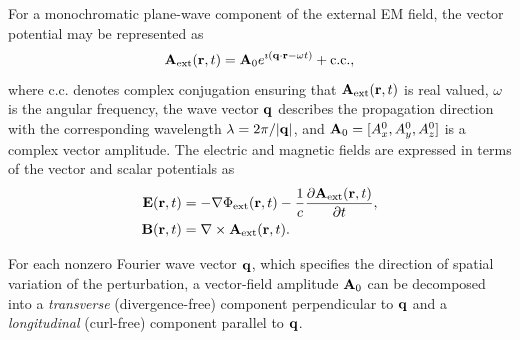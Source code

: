 For a monochromatic plane-wave component of the external EM field,
the vector potential may be represented as
\begin{equation}
 \vb A_{\mathrm{ext}}(\vb r,t)
 =\vb A_0 e^{\imath(\vb q\cdot\vb r-\omega t)}+\mathrm{c.c.},
 \label{eq:plane_wave_vector_potential}
\end{equation}
where c.c. denotes complex conjugation ensuring that $\vb A_{\mathrm{ext}}(\vb r,t)$ is real valued,
$\omega$ is the angular frequency, the wave vector $\vb q$
describes the propagation direction with the corresponding  wavelength
$\lambda=2\pi/|\vb q|$, and $\vb A_0=[A_x^0,A_y^0,A_z^0]$
is a complex vector  amplitude.
The electric and magnetic fields are
expressed in terms of the vector and scalar potentials as
\begin{align}
 \vb E(\vb r,t)
 &=-\nabla\Phi_{\mathrm{ext}}(\vb r,t)
   -\frac{1}{c}\frac{\partial\vb A_{\mathrm{ext}}(\vb r,t)}{\partial t},
 \label{eq:em_E_from_A+Phi}\\
 \vb B(\vb r,t)&=\nabla\times\vb A_{\mathrm{ext}}(\vb r,t).
 \label{eq:em_B_from_A}
\end{align}

For each nonzero Fourier wave vector $\vb q$, which specifies
the direction of spatial variation of the perturbation,
a vector-field amplitude $\vb A_0$ can be decomposed into a \emph{transverse}
(divergence-free) component perpendicular to $\vb q$ and a
\emph{longitudinal} (curl-free) component parallel to $\vb q$.

